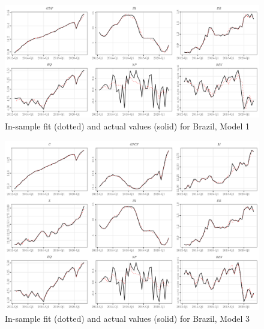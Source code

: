\documentclass[a4paper, twoside]{templates/ociamthesis}
\begin{document}
\begin{figure}[!ht]

{\centering \includegraphics[width=0.99\columnwidth]{figure/g.model1t.br} 

}

\caption{In-sample fit (dotted) and actual values (solid) for Brazil, Model 1}\label{fig:Figure5FITBR1}
\end{figure}

\begin{figure}[!ht]

{\centering \includegraphics[width=0.99\columnwidth]{figure/g.model3t.br} 

}

\caption{In-sample fit (dotted) and actual values (solid) for Brazil, Model 3}\label{fig:Figure5FITBR3}
\end{figure}

\clearpage
\end{document}
